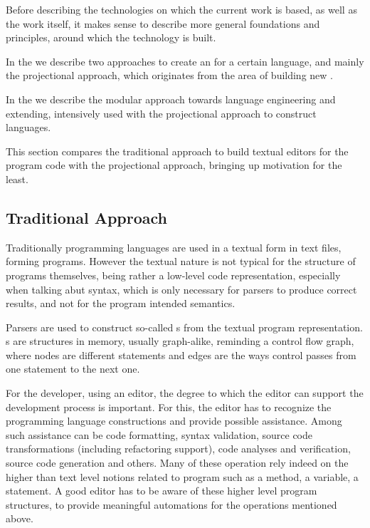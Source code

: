 
Before describing the technologies on which the current work is based, as well as the work itself,
it makes sense to describe more general foundations and principles, around which the technology is built.

In the  we describe two approaches to create an  for a certain language, and mainly the 
projectional approach, which originates from the area of building new .

In the  we describe the modular approach towards language engineering and extending, intensively
used with the projectional approach to construct languages.



This section compares the traditional approach to build textual editors for the program code with
the projectional approach, bringing up  motivation for the least.

\subsection{Traditional Approach}
Traditionally programming languages are used in a textual form in text files, forming programs.
However the textual nature is not typical for the structure of programs themselves, being rather a low-level code representation, especially when talking abut syntax, which is only necessary for 
parsers to produce correct results, and not for the program intended semantics.


Parsers are used to construct so-called s from the textual 
program representation. s are structures in memory, usually graph-alike, 
reminding a control flow graph, where nodes are different statements and edges are 
the ways control passes from one statement to the next one.

For the developer, using an editor, the degree to which the editor can support the development
process is important. For this, the editor has to recognize the programming language constructions and provide possible assistance. Among such assistance can be code formatting, syntax validation,
source code transformations (including refactoring support), code analyses and verification, 
source code generation and others. Many of these operation rely indeed on the higher than text level notions related to program such as a method, a variable, a statement. 
A good editor has to be aware of these higher level program structures, to provide meaningful automations for the operations mentioned above.

